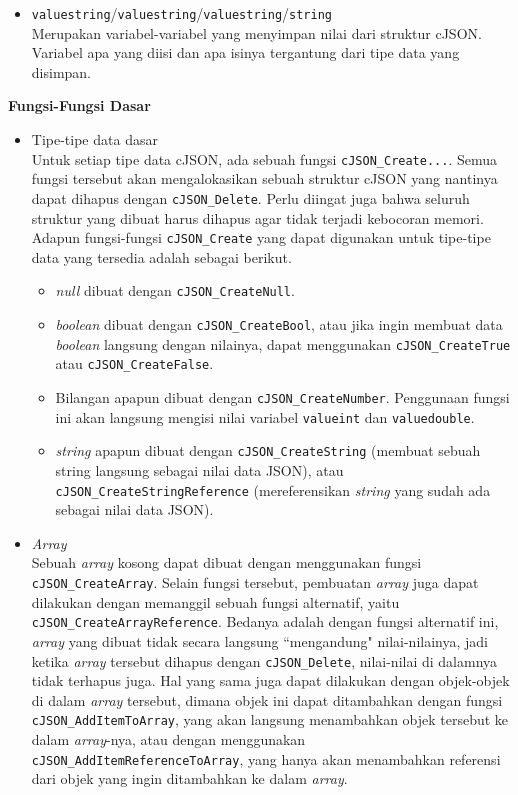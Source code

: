 \documentclass[a4paper,twoside]{article}
\begin{document}
\begin{enumerate}
\begin{itemize}
	\item \verb|valuestring|/\verb|valuestring|/\verb|valuestring|/\verb|string|\\	
	Merupakan variabel-variabel yang menyimpan nilai dari struktur cJSON. Variabel apa yang diisi dan apa isinya tergantung dari tipe data yang disimpan.
\end{itemize}

\textbf{Fungsi-Fungsi Dasar}
\label{sec:cmodules-cJSON-basicfuncts}

\begin{itemize}
	\item Tipe-tipe data dasar\\
	Untuk setiap tipe data cJSON, ada sebuah fungsi \verb|cJSON_Create...|. Semua fungsi tersebut akan mengalokasikan sebuah struktur cJSON yang nantinya dapat dihapus dengan \verb|cJSON_Delete|. Perlu diingat juga bahwa seluruh struktur yang dibuat harus dihapus agar tidak terjadi kebocoran memori. Adapun fungsi-fungsi \verb|cJSON_Create| yang dapat digunakan untuk tipe-tipe data yang tersedia adalah sebagai berikut.
	
	\begin{itemize}
		\item \textit{null} dibuat dengan \verb|cJSON_CreateNull|.
		\item \textit{boolean} dibuat dengan \verb|cJSON_CreateBool|, atau jika ingin membuat data \textit{boolean} langsung dengan nilainya, dapat menggunakan \verb|cJSON_CreateTrue| atau \verb|cJSON_CreateFalse|.
		\item Bilangan apapun dibuat dengan \verb|cJSON_CreateNumber|. Penggunaan fungsi ini akan langsung mengisi nilai variabel \verb|valueint| dan \verb|valuedouble|.
		\item \textit{string} apapun dibuat dengan \verb|cJSON_CreateString| (membuat sebuah string langsung sebagai nilai data JSON), atau \verb|cJSON_CreateStringReference| (mereferensikan \textit{string} yang sudah ada sebagai nilai data JSON).
	\end{itemize}
	
	\item \textit{Array}\\
	Sebuah \textit{array} kosong dapat dibuat dengan menggunakan fungsi \verb|cJSON_CreateArray|. Selain \mbox{fungsi} tersebut, pembuatan \textit{array} juga dapat dilakukan dengan memanggil sebuah fungsi alternatif, yaitu \verb|cJSON_CreateArrayReference|. Bedanya adalah dengan fungsi alternatif ini, \textit{array} yang dibuat tidak secara langsung ``mengandung" nilai-nilainya, jadi ketika \textit{array} tersebut dihapus dengan \verb|cJSON_Delete|, nilai-nilai di dalamnya tidak terhapus juga. Hal yang sama juga dapat dilakukan dengan objek-objek di dalam \textit{array} tersebut, dimana objek ini dapat ditambahkan dengan fungsi \verb|cJSON_AddItemToArray|, yang akan langsung menambahkan objek tersebut ke dalam \textit{array}-nya, atau dengan menggunakan \verb|cJSON_AddItemReferenceToArray|, yang hanya akan menambahkan referensi dari objek yang ingin ditambahkan ke dalam \textit{array}.
	

\end{itemize}
\end{enumerate}
\end{document}

